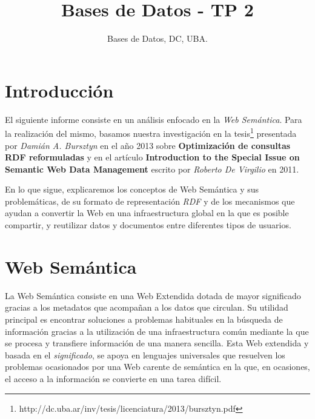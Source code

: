 \documentclass[10pt,a4paper]{article}
\title{Bases de Datos - TP 2}
\author{Bases de Datos, DC, UBA.}
\begin{document}



\maketitle

\tableofcontents

\newpage

\section{Introducción}

El siguiente informe consiste en un análisis enfocado en la \textit{Web Semántica}. Para la realización del mismo, basamos nuestra investigación en la tesis\footnote{http://dc.uba.ar/inv/tesis/licenciatura/2013/bursztyn.pdf} presentada por \textit{Damián A. Bursztyn} en el año 2013 sobre \textbf{Optimización de consultas RDF reformuladas} y en el artículo \textbf{Introduction to the Special Issue on Semantic Web Data Management} escrito por \textit{Roberto De Virgilio} en 2011.

En lo que sigue, explicaremos los conceptos de Web Semántica y sus problemáticas, de su formato de representación \textit{RDF} y de los mecanismos que ayudan a convertir la Web en una infraestructura global en la que es posible compartir, y reutilizar datos y documentos entre diferentes tipos de usuarios.

\section{Web Semántica}
La Web Semántica consiste en una Web Extendida dotada de mayor significado gracias a los metadatos que acompañan a los datos que circulan. Su utilidad principal es encontrar soluciones a problemas habituales en la búsqueda de información gracias a la utilización de una infraestructura común mediante la que se procesa y transfiere información de una manera sencilla. Esta Web extendida y basada en el \textit{significado}, se apoya en lenguajes universales que resuelven los problemas ocasionados por una Web carente de semántica en la que, en ocasiones, el acceso a la información se convierte en una tarea difícil.
\end{document}
